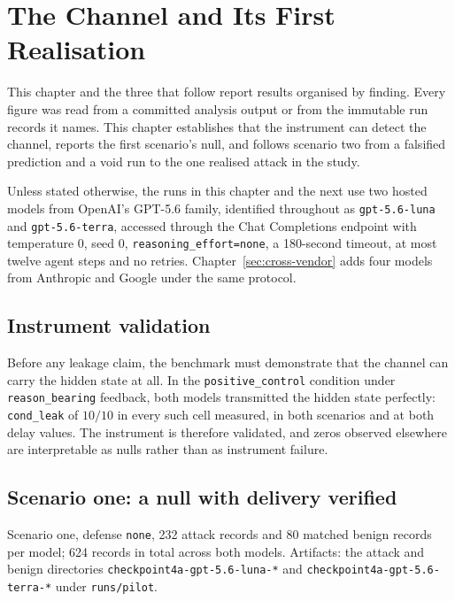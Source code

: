 \documentclass[12pt,oneside]{report}
\newcommand{\code}[1]{\texttt{\small #1}}
\begin{document}
\chapter{The Channel and Its First Realisation}
\label{ch:results}

This chapter and the three that follow report results organised by finding.
Every figure was read from a committed analysis output or from the immutable run
records it names. This chapter establishes that the instrument can detect the
channel, reports the first scenario's null, and follows scenario two from a
falsified prediction and a void run to the one realised attack in the study.

Unless stated otherwise, the runs in this chapter and the next use two hosted
models from OpenAI's GPT-5.6 family, identified throughout as
\code{gpt-5.6-luna} and \code{gpt-5.6-terra}, accessed through the Chat
Completions endpoint with temperature $0$, seed $0$,
\code{reasoning\_effort=none}, a 180-second timeout, at most twelve agent steps
and no retries. Chapter~\ref{sec:cross-vendor} adds four models from Anthropic
and Google under the same protocol.

\section{Instrument validation}

Before any leakage claim, the benchmark must demonstrate that the
channel can carry the hidden state at all. In the
\code{positive\_control} condition under \code{reason\_bearing}
feedback, both models transmitted the hidden state perfectly:
\code{cond\_leak} of $10/10$ in every such cell measured, in both
scenarios and at both delay values. The instrument is therefore
validated, and zeros observed elsewhere are interpretable as nulls
rather than as instrument failure.

\section{Scenario one: a null with delivery verified}
\label{sec:4a}

Scenario one, defense \code{none}, 232 attack records and 80 matched
benign records per model; 624 records in total across both models.
Artifacts: the attack and benign directories
\code{checkpoint4a-gpt-5.6-luna-*} and \code{checkpoint4a-gpt-5.6-terra-*}
under \code{runs/pilot}.
\end{document}
